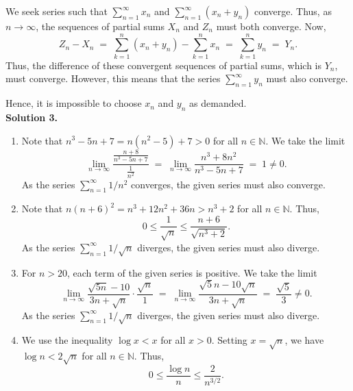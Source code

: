 \documentclass[10pt]{article}
\begin{document}
        We seek series such that $\sum_{n = 1}^\infty x_n$ and $\sum_{n = 1}^\infty (x_n + y_n)$ converge. Thus, as $n \to \infty$,
        the sequences of partial sums $X_n$ and $Z_n$ must both converge. Now, 
        \[
        Z_n - X_n \;=\;\sum_{k = 1}^n (x_n + y_n) - \sum_{k = 1}^n x_n \;=\; \sum_{k = 1}^n y_n \;=\; Y_n.
        \]
        Thus, the difference of these convergent sequences of partial sums, which is $Y_n$, must converge. However, this means that
        the series $\sum_{n = 1}^\infty y_n$ must also converge.

        Hence, it is impossible to choose $x_n$ and $y_n$ as demanded. \\

        \textbf{Solution 3.}
        \begin{enumerate}
                \item Note that $n^3 - 5n + 7 = n(n^2 - 5) + 7 > 0$ for all $n \in \mathbb{N}$.
                        We take the limit
                        \[
                        \lim_{n \to \infty} \frac{\frac{n + 8}{n^3 - 5n + 7}}{\frac{1}{n^2}} \;=\; 
                        \lim_{n \to \infty} \frac{n^3 + 8n^2}{n^3 - 5n + 7} \;=\; 1 \neq 0.
                        \]
                        As the series $\sum_{n = 1}^\infty 1 /n^2$ converges, the given series must also converge.
                \item Note that $n(n + 6)^2  = n^3 + 12n^2 + 36n > n^3 + 2$ for all $n \in \mathbb{N}$.
                        Thus,
                        \[
                                0 \le\frac{1}{\sqrt{n}} \le \frac{n + 6}{\sqrt{n^3 + 2}} .
                        \]
                        As the series $\sum_{n = 1}^\infty 1 /\sqrt{n}$ diverges, the given series must also diverge.
                \item For $n > 20$, each term of the given series is positive. We take the limit
                        \[
                        \lim_{n \to \infty} \frac{\sqrt{5n} - 10}{3n + \sqrt{n}} \cdot \frac{\sqrt{n}}{1} \;=\;
                        \lim_{n \to \infty} \frac{\sqrt{5}n - 10\sqrt{n}}{3n + \sqrt{n}} \;=\; \frac{\sqrt{5}}{3} \neq 0.
                        \]
                        As the series $\sum_{n = 1}^\infty 1 /\sqrt{n}$ diverges, the given series must also diverge.
                \item We use the inequality $\log{x} < x$ for all $x > 0$. Setting $x = \sqrt{n}$, we have $\log{n} < 2\sqrt{n}$ for all
                        $n \in \mathbb{N}$. Thus,
                        \[0 \le \frac{\log{n}}{n} \le \frac{2}{n^{3 /2}}.\]

\end{enumerate}
\end{document}
